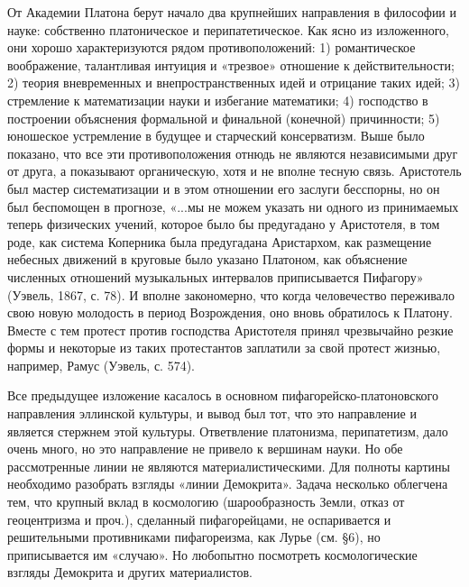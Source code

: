 От Академии Платона берут начало два крупнейших направления в
философии и науке: собственно платоническое и перипатетическое. Как
ясно из изложенного, они хорошо характеризуются рядом
противоположений: 1) романтическое воображение, талантливая интуиция и
«трезвое» отношение к действительности; 2) теория вневременных и
внепространственных идей и отрицание таких идей; 3) стремление к
математизации науки и избегание математики; 4) господство в построении
объяснения формальной и финальной (конечной) причинности; 5) юношеское
устремление в будущее и старческий консерватизм. Выше было показано,
что все эти противоположения отнюдь не являются независимыми друг от
друга, а показывают органическую, хотя и не вполне тесную связь.
Аристотель был мастер систематизации и в этом отношении его заслуги
бесспорны, но он был беспомощен в прогнозе, «...мы не можем указать ни
одного из принимаемых теперь физических учений, которое было бы
предугадано у Аристотеля, в том роде, как система Коперника была
предугадана Аристархом, как размещение небесных движений в круговые
было указано Платоном, как объяснение численных отношений музыкальных
интервалов приписывается Пифагору» (Уэвель, 1867, с. 78). И вполне
закономерно, что когда человечество переживало свою новую молодость в
период Возрождения, оно вновь обратилось к Платону. Вместе с тем
протест против господства Аристотеля принял чрезвычайно резкие формы и
некоторые из таких протестантов заплатили за свой протест жизнью,
например, Рамус (Уэвель, с. 574).

Все предыдущее изложение касалось в основном
пифагорейско-платоновского направления эллинской культуры, и вывод был
тот, что это направление и является стержнем этой культуры.
Ответвление платонизма, перипатетизм, дало очень много, но это
направление не привело к вершинам науки. Но обе рассмотренные линии не
являются материалистическими. Для полноты картины необходимо разобрать
взгляды «линии Демокрита». Задача несколько облегчена тем, что крупный
вклад в космологию (шарообразность Земли, отказ от геоцентризма и
проч.), сделанный пифагорейцами, не оспаривается и решительными
противниками пифагореизма, как Лурье (см. §6), но приписывается им
«случаю». Но любопытно посмотреть космологические взгляды Демокрита и
других материалистов.

